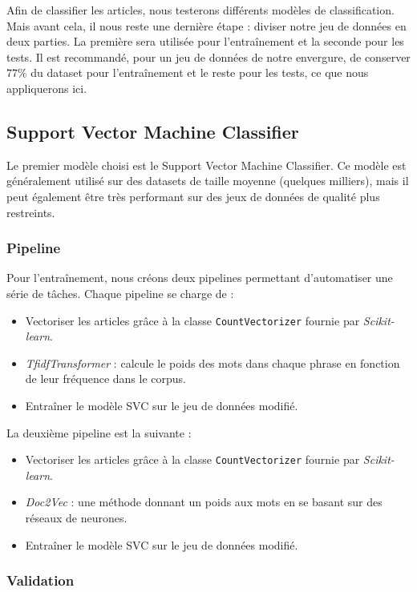 \documentclass[a4paper,12pt]{article}
\begin{document}
Afin de classifier les articles, nous testerons différents modèles de classification. Mais avant cela, il nous reste une dernière étape : diviser notre jeu de données en deux parties. La première sera utilisée pour l'entraînement et la seconde pour les tests. Il est recommandé, pour un jeu de données de notre envergure, de conserver $77\%$ du dataset pour l'entraînement et le reste pour les tests, ce que nous appliquerons ici.

\subsection{Support Vector Machine Classifier}

Le premier modèle choisi est le Support Vector Machine Classifier. Ce modèle est généralement utilisé sur des datasets de taille moyenne (quelques milliers), mais il peut également être très performant sur des jeux de données de qualité plus restreints.


\subsubsection{Pipeline}

Pour l'entraînement, nous créons deux pipelines permettant d'automatiser une série de tâches. Chaque pipeline se charge de :
\begin{itemize}
    \item Vectoriser les articles grâce à la classe \texttt{CountVectorizer} fournie par \textit{Scikit-learn}.
    \item \textit{TfidfTransformer} : calcule le poids des mots dans chaque phrase en fonction de leur fréquence dans le corpus.
    \item Entraîner le modèle SVC sur le jeu de données modifié.
\end{itemize}

La deuxième pipeline est la suivante :
\begin{itemize}
    \item Vectoriser les articles grâce à la classe \texttt{CountVectorizer} fournie par \textit{Scikit-learn}.
    \item \textit{Doc2Vec} : une méthode donnant un poids aux mots en se basant sur des réseaux de neurones.
    \item Entraîner le modèle SVC sur le jeu de données modifié.
\end{itemize}

\subsubsection{Validation}
\end{document}

